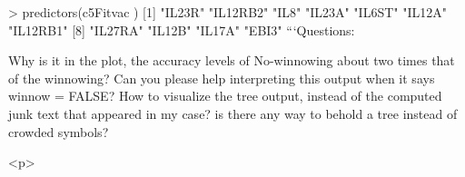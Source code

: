 > predictors(c5Fitvac )
 [1] "IL23R"   "IL12RB2" "IL8"     "IL23A"   "IL6ST"   "IL12A"   "IL12RB1"
 [8] "IL27RA"  "IL12B"   "IL17A"   "EBI3"
```Questions:

Why is it in the plot, the accuracy levels of No-winnowing about two times that of the winnowing? Can you please help interpreting this output when it says winnow = FALSE?
How to visualize the tree output, instead of the computed junk text that appeared in my case? is there any way to behold a tree instead of crowded symbols?


<p>
